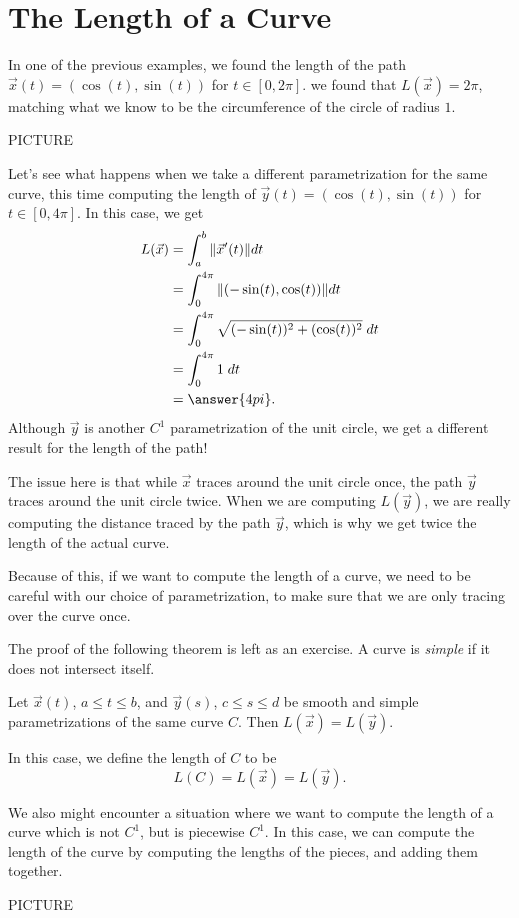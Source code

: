 \documentclass{ximera}
\begin{document}
\section*{The Length of a Curve}

In one of the previous examples, we found the length of the path $\vec{x}(t) = (\cos(t),\sin(t))$ for $t\in [0,2\pi]$. we found that $L(\vec{x}) = 2\pi$, matching what we know to be the circumference of the circle of radius $1$.

PICTURE

Let's see what happens when we take a different parametrization for the same curve, this time computing the length of $\vec{y}(t) = (\cos(t),\sin(t))$ for $t\in[0,4\pi]$. In this case, we get
\begin{align*}
L(\vec{x}) &= \int_a^b\|\vec{x}'(t)\|dt\\
&= \int_{0}^{4\pi}\|(-\sin(t),\cos(t))\|dt\\
&= \int_{0}^{4\pi} \sqrt{(-\sin(t))^2 + (\cos(t))^2}\;dt\\
&= \int_{0}^{4\pi} 1\;dt\\
& = \answer{4pi}.
\end{align*}
Although $\vec{y}$ is another $C^1$ parametrization of the unit circle, we get a different result for the length of the path!

The issue here is that while $\vec{x}$ traces around the unit circle once, the path $\vec{y}$ traces around the unit circle twice. When we are computing $L(\vec{y})$, we are really computing the distance traced by the path $\vec{y}$, which is why we get twice the length of the actual curve.

Because of this, if we want to compute the length of a curve, we need to be careful with our choice of parametrization, to make sure that we are only tracing over the curve once. 

The proof of the following theorem is left as an exercise. A curve is \emph{simple} if it does not intersect itself.

\begin{theorem}
Let $\vec{x}(t)$, $a\leq t\leq b$, and $\vec{y}(s)$, $c\leq s\leq d$ be smooth and simple parametrizations of the same curve $C$. Then $L(\vec{x}) = L(\vec{y})$.

In this case, we define the length of $C$ to be
\[
L(C) = L(\vec{x}) = L(\vec{y}).
\]
\end{theorem}

We also might encounter a situation where we want to compute the length of a curve which is not $C^1$, but is piecewise $C^1$. In this case, we can compute the length of the curve by computing the lengths of the pieces, and adding them together.

PICTURE
\end{document}
